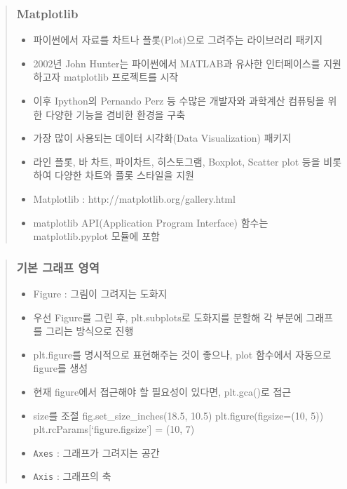 \documentclass[11pt]{article}
\providecommand{\tightlist}{%
      \setlength{\itemsep}{0pt}\setlength{\parskip}{0pt}}
\begin{document}
\begin{quote}
\hypertarget{matplotlib-1}{%
\subsubsection{Matplotlib}\label{matplotlib-1}}

\begin{itemize}
\tightlist
\item
  파이썬에서 자료를 차트나 플롯(Plot)으로 그려주는 라이브러리 패키지
\item
  2002년 John Hunter는 파이썬에서 MATLAB과 유사한 인터페이스를
  지원하고자 matplotlib 프로젝트를 시작
\item
  이후 Ipython의 Pernando Perz 등 수많은 개발자와 과학계산 컴퓨팅을 위한
  다양한 기능을 겸비한 환경을 구축
\item
  가장 많이 사용되는 데이터 시각화(Data Visualization) 패키지
\item
  라인 플롯, 바 차트, 파이차트, 히스토그램, Boxplot, Scatter plot 등을
  비롯하여 다양한 차트와 플롯 스타일을 지원
\item
  Matplotlib : http://matplotlib.org/gallery.html
\item
  matplotlib API(Application Program Interface) 함수는 matplotlib.pyplot
  모듈에 포함
\end{itemize}
\end{quote}

\begin{quote}
\hypertarget{uxae30uxbcf8-uxadf8uxb798uxd504-uxc601uxc5ed}{%
\subsubsection{기본 그래프
영역}\label{uxae30uxbcf8-uxadf8uxb798uxd504-uxc601uxc5ed}}

\begin{itemize}
\tightlist
\item
  Figure : 그림이 그려지는 도화지
\item
  우선 Figure를 그린 후, plt.subplots로 도화지를 분할해 각 부분에
  그래프를 그리는 방식으로 진행
\item
  plt.figure를 명시적으로 표현해주는 것이 좋으나, plot 함수에서 자동으로
  figure를 생성
\item
  현재 figure에서 접근해야 할 필요성이 있다면, plt.gca()로 접근
\item
  size를 조절 fig.set\_size\_inches(18.5, 10.5) plt.figure(figsize=(10,
  5)) plt.rcParams{[}`figure.figsize'{]} = (10, 7)
\item
  \texttt{Axes} : 그래프가 그려지는 공간
\item
  \texttt{Axis} : 그래프의 축
\end{itemize}
\end{quote}
\end{document}
